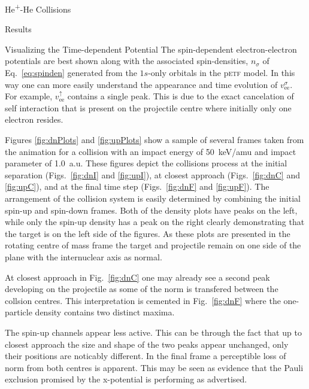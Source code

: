 \documentclass[letterpaper, 11 pt]{report}
\begin{document}
\begin{chapter}{\texorpdfstring{He\textsuperscript{+}}{He+}-He Collisions \label{chap:hephe}}
\begin{section}{Results \label{sec:hephe-disc}}
\begin{subsection}{Visualizing the Time-dependent Potential \label{sec:visual}}
         The spin-dependent electron-electron potentials are best shown along with the associated
         spin-densities, $n_\sigma$ of Eq.~\eqref{eq:spinden} generated from the $1s$-only orbitals in
         the p\textsc{etf} model. In this way one can more easily understand the appearance and time
         evolution of $v_\mathrm{ee}^\sigma$. For example, $v_\mathrm{ee}^\uparrow$ contains a single
         peak. This is due to the exact cancelation of self interaction that is present on the
         projectile centre where initially only one electron resides.

         Figures \ref{fig:dnPlots} and \ref{fig:upPlots} show a sample of several frames taken from the
         animation for a collision with an impact energy of 50~keV/amu and impact parameter of 1.0~a.u.
         These figures depict the collisions process at the initial separation (Figs.~\ref{fig:dnI} and
         \ref{fig:upI}), at closest approach (Figs.~\ref{fig:dnC} and \ref{fig:upC}), and at the final
         time step (Figs.~\ref{fig:dnF} and \ref{fig:upF}). The arrangement of the collision system is
         easily determined by combining the initial spin-up and spin-down frames. Both of the density
         plots have peaks on the left, while only the spin-up density has a peak on the right clearly
         demonstrating that the target is on the left side of the figures. As these plots are presented
         in the rotating centre of mass frame the target and projectile remain on one side of the plane
         with the internuclear axis as normal.

         At closest approach in Fig.~\ref{fig:dnC} one may already see a
         second peak developing on the projectile as some of the norm is transfered between the collsion
         centres. This interpretation is cemented in Fig.~\ref{fig:dnF} where the one-particle density
         contains two distinct maxima.

         The spin-up channels appear less active. This can be through the fact that up to closest
         approach the size and shape of the two peaks appear unchanged, only their positions are
         noticably different. In the final frame a perceptible loss of norm from both centres is
         apparent. This may be seen as evidence that the Pauli exclusion promised by the x-potential is
         performing as advertised.

         \FloatBarrier

      \end{subsection}


\end{section}
\end{chapter}
\end{document}
